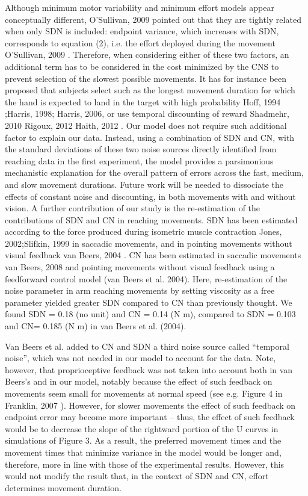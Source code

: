 Although minimum motor variability and minimum effort models appear conceptually different, {O'Sullivan, 2009} pointed out that they are tightly related when only SDN is included: endpoint variance, which increases with SDN, corresponds to equation (2), i.e. the effort deployed during the movement {O'Sullivan, 2009 }. 
Therefore, when considering either of these two factors, an additional term has to be considered in the cost minimized by the CNS to prevent selection of the slowest possible movements. 
It has for instance been proposed that subjects select such as the longest movement duration for which the hand is expected to land in the target with high probability {Hoff, 1994 ;Harris, 1998; Harris, 2006}, or use temporal discounting of reward {Shadmehr, 2010 } {Rigoux, 2012 }{Haith, 2012 }.  Our model does not require such additional factor to explain our data.
Instead, using a combination of SDN and CN, with the standard deviations of these two noise sources directly identified from reaching data in the first experiment, the model provides a parsimonious mechanistic explanation for the overall pattern of errors across the fast, medium, and slow movement durations.  
Future work will be needed to dissociate the effects of constant noise and discounting, in both movements with and without vision.
A further contribution of our study is the re-estimation of the contributions of SDN and CN in reaching movements. SDN has been estimated according to the force produced during isometric muscle contraction {Jones, 2002;Slifkin, 1999} in saccadic movements, and in pointing movements without visual feedback {van Beers, 2004 }. CN has been estimated in saccadic movements {van Beers, 2008 } and pointing movements without visual feedback using a feedforward control model (van Beers et al. 2004). Here, re-estimation of the noise parameter in arm reaching movements by setting viscosity as a free parameter yielded greater SDN compared to CN than previously thought. We found SDN = 0.18 (no unit) and CN = 0.14 (N m), compared to SDN = 0.103 and CN= 0.185 (N m) in van Beers et al. (2004). 

Van Beers et al. added to CN and SDN a third noise source called “temporal noise”, which was not needed in our model to account for the data. Note, however, that proprioceptive feedback was not taken into account both in van Beers’s and in our model, notably because the effect of such feedback on movements seem small for movements at normal speed (see e.g. Figure 4 in {Franklin, 2007 }). However, for slower movements the effect of such feedback on endpoint error may become more important – thus, the effect of such feedback would be to decrease the slope of the rightward portion of the U curves in simulations of Figure 3. As a result, the preferred movement times and the movement times that minimize variance in the model would be longer and, therefore, more in line with those of the experimental results. However, this would not modify the result that, in the context of SDN and CN, effort determines movement duration.


